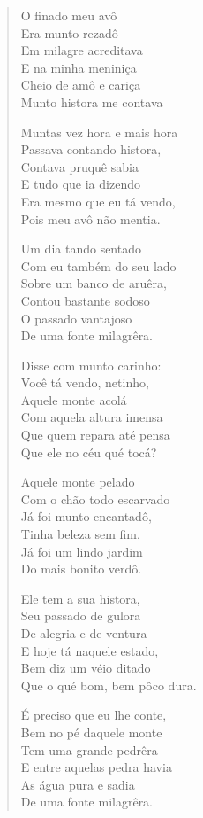 \begin{verse}
O finado meu avô\\
Era munto rezadô\\
Em milagre acreditava\\
E na minha meniniça\\
Cheio de amô e cariça\\
Munto histora me contava

Muntas vez hora e mais hora\\
Passava contando histora,\\
Contava pruquê sabia\\
E tudo que ia dizendo\\
Era mesmo que eu tá vendo,\\
Pois meu avô não mentia.

Um dia tando sentado\\
Com eu também do seu lado\\
Sobre um banco de aruêra,\\
Contou bastante sodoso\\
O passado vantajoso\\
De uma fonte milagrêra.

Disse com munto carinho:\\
Você tá vendo, netinho,\\
Aquele monte acolá\\
Com aquela altura imensa\\
Que quem repara até pensa\\
Que ele no céu qué tocá?

Aquele monte pelado\\
Com o chão todo escarvado\\
Já foi munto encantadô,\\
Tinha beleza sem fim,\\
Já foi um lindo jardim\\
Do mais bonito verdô.

Ele tem a sua histora,\\
Seu passado de gulora\\
De alegria e de ventura\\
E hoje tá naquele estado,\\
Bem diz um véio ditado\\
Que o qué bom, bem pôco dura.

É preciso que eu lhe conte,\\
Bem no pé daquele monte\\
Tem uma grande pedrêra\\
E entre aquelas pedra havia\\
As água pura e sadia\\
De uma fonte milagrêra.


\end{verse}
